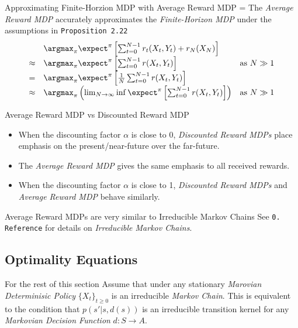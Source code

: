 \documentclass[11pt,a4paper]{article}
\begin{document}
  \begin{proposition}{Approximating Finite-Horzion MDP with Average Reward MDP}
    \everymath={\displaystyle}
    The \textit{Average Reward MDP} accurately approximates the \textit{Finite-Horizon MDP} under the assumptions in \texttt{Proposition 2.22}
    \[\begin{array}{rll}
      &\argmax_\pi\expect^\pi\left[\sum_{t=0}^{N-1}r_t(X_t,Y_t)+r_N(X_N)\right]\\
      \approx&\argmax_\pi\expect^\pi\left[\sum_{t=0}^{N-1}r(X_t,Y_t)\right]&\text{as }N\gg1\\
      =&\argmax_\pi\expect^\pi\left[\frac1N\sum_{t=0}^{N-1}r(X_t,Y_t)\right]\\
      \approx&\argmax_\pi\left(\lim_{N\to\infty}\inf\expect^\pi\left[\sum_{t=0}^{N-1}r(X_t,Y_t)\right]\right)&\text{as }N\gg1
    \end{array}\]
  \end{proposition}

  \begin{remark}{Average Reward MDP vs Discounted Reward MDP}
    \begin{itemize}
      \item When the discounting factor $\alpha$ is close to 0, \textit{Discounted Reward MDPs} place emphasis on the present/near-future over the far-future.
      \item The \textit{Average Reward MDP} gives the same emphasis to all received rewards.
      \item When the discounting factor $\alpha$ is close to 1, \textit{Discounted Reward MDPs} and \textit{Average Reward MDP} behave similarly.
    \end{itemize}
  \end{remark}

  \begin{remark}{Average Reward MDPs are very similar to Irreducible Markov Chains}
    See \texttt{0. Reference}  for details on \textit{Irreducible Markov Chains}.
  \end{remark}

\subsection*{Optimality Equations}

  \begin{remark}{For the rest of this section}
    Assume that under any stationary \textit{Marovian Determinisic Policy} $\{X_t\}_{t\geq0}$ is an irreducible \textit{Markov Chain}. This is equivalent to the condition that $p(s'|s,d(s))$ is an irreducible transition kernel for any \textit{Markovian Decision Function} $d:S\to A$.
  \end{remark}
\end{document}
